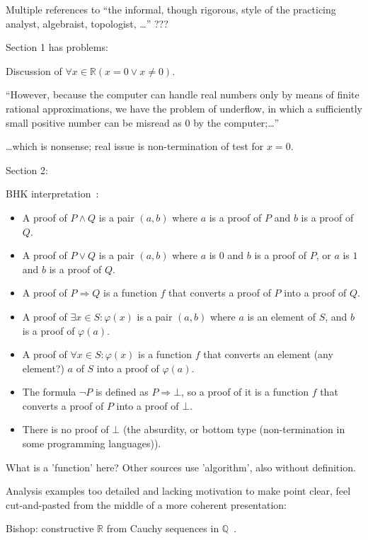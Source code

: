 Multiple references to ``the informal, though rigorous, 
style of the practicing analyst, algebraist, topologist, \ldots''
???

Section 1 has problems:

Discussion of
$ \forall x \in \mathbb{R} (x = 0 \vee x \ne 0)$.

``However, because the computer can handle real numbers 
only by means of finite rational approximations, 
we have the problem of underflow, 
in which a sufficiently small positive number can be misread as 0 
by the computer;\ldots''

\ldots which is nonsense;
real issue is non-termination of test for $x=0$.

Section 2:

BHK interpretation~\cite{wiki:Brouwer_Heyting_Kolmogorov_interpretation}:
\begin{itemize}
  \item A proof of $P\wedge Q$ 
  is a pair $(a,b)$ where $a$ is a proof of $P$ 
  and $b$ is a proof of $Q$.
\item A proof of $P\vee Q$ is a pair $(a,b)$ 
where $a$ is $0$ and 
$b$ is a proof of $P$, 
or $a$ is $1$ 
and $b$ is a proof of $Q$.
\item A proof of $P\Rightarrow Q$ is 
a function $f$ that converts 
a proof of $P$ into a proof of $Q$.
\item A proof of $\exists x\in S:\varphi (x)$ is 
a pair $(a,b)$ where 
$a$ is an element of $S$, 
and $b$ is a proof of $\varphi (a)$.
\item A proof of $\forall x\in S:\varphi (x)$ is 
a function $f$ that converts 
an element (any element?) $a$ of $S$ into a proof of $\varphi (a)$.
\item The formula $\neg P$ is defined as $P\Rightarrow \bot$, 
so a proof of it is a function $f$ that converts 
a proof of $P$ into a proof of $\bot$.
\item There is no proof of $\bot$
(the absurdity, or bottom type 
(non-termination in some programming languages)).
\end{itemize}
What is a 'function' here? 
Other sources use 'algorithm', also without definition.

Analysis examples too detailed and lacking motivation 
to make point clear, feel cut-and-pasted from the middle
of a more coherent presentation:

Bishop: constructive $\mathbb{R}$ 
from Cauchy sequences 
in $\mathbb{Q}$~\cite{bishop1985constructive}.

